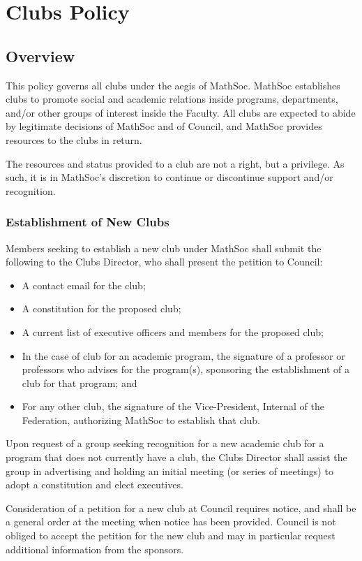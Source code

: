 \section{Clubs Policy}
\subsection{Overview}
This policy governs all clubs under the aegis of MathSoc. MathSoc establishes
clubs to promote social and academic relations inside programs, departments,
and/or other groups of interest inside the Faculty. All clubs are expected to
abide by legitimate decisions of MathSoc and of Council, and MathSoc provides
resources to the clubs in return.

The resources and status provided to a club are not a right, but a privilege.
As such, it is in MathSoc's discretion to continue or discontinue support and/or
recognition.

\subsubsection{Establishment of New Clubs}
Members seeking to establish a new club under MathSoc shall submit the following
to the Clubs Director, who shall present the petition to Council:

\begin{itemize}
  \item A contact email for the club;
  \item A constitution for the proposed club;
  \item A current list of executive officers and members for the proposed club;
  \item In the case of club for an academic program, the signature of a
    professor or professors who advises for the program(s), sponsoring the
    establishment of a club for that program; and
  \item For any other club, the signature of the Vice-President, Internal of the
    Federation, authorizing MathSoc to establish that club.
\end{itemize}

Upon request of a group seeking recognition for a new academic club for a
program that does not currently have a club, the Clubs Director shall assist the
group in advertising and holding an initial meeting (or series of meetings) to
adopt a constitution and elect executives.

Consideration of a petition for a new club at Council requires notice, and shall
be a general order at the meeting when notice has been provided. Council is not
obliged to accept the petition for the new club and may in particular request
additional information from the sponsors.

